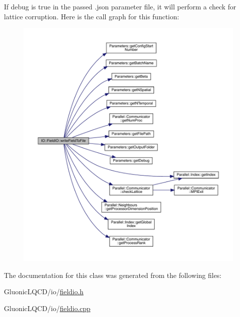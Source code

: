 If debug is true in the passed .json parameter file, it will perform a check for lattice corruption. Here is the call graph for this function\+:
\nopagebreak
\begin{figure}[H]
\begin{center}
\leavevmode
\includegraphics[width=350pt]{class_i_o_1_1_field_i_o_a8af607f9a1d79e90d4514c36103c6601_cgraph}
\end{center}
\end{figure}


The documentation for this class was generated from the following files\+:\begin{DoxyCompactItemize}
\item 
Gluonic\+L\+Q\+C\+D/io/\mbox{\hyperlink{fieldio_8h}{fieldio.\+h}}\item 
Gluonic\+L\+Q\+C\+D/io/\mbox{\hyperlink{fieldio_8cpp}{fieldio.\+cpp}}\end{DoxyCompactItemize}
